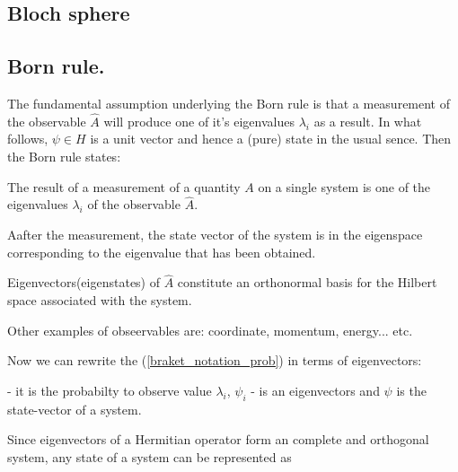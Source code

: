 \documentclass{article}
\begin{document}
\subsection{Bloch sphere}


\subsection{Born rule.}

The fundamental assumption underlying the Born rule is that a measurement of the observable $\hat{A}$ will produce one of it's eigenvalues $\lambda_i$ as a result. In what follows, $\psi \in H$ is a unit vector and hence a (pure) state in the usual sence. Then the Born rule states:

The result of a measurement of a quantity $A$ on a single system is one of the eigenvalues $\lambda_{i}$ of the observable $\hat{A}$.

Aafter the measurement, the state vector of the system is in the eigenspace corresponding to the eigenvalue that has been obtained.

Eigenvectors(eigenstates) of $\hat{A}$ constitute an orthonormal basis for the Hilbert space  associated with the system.



Other examples of obseervables are: coordinate, momentum, energy... etc.


Now we can rewrite the (\ref{braket_notation_prob}) in terms of eigenvectors:



- it is the probabilty to observe value $\lambda_i$, $\psi_i$ - is an eigenvectors and $\psi$ is the state-vector of a system.

Since eigenvectors of a Hermitian operator form an complete and orthogonal system, any state of a system can be represented as
\end{document}
